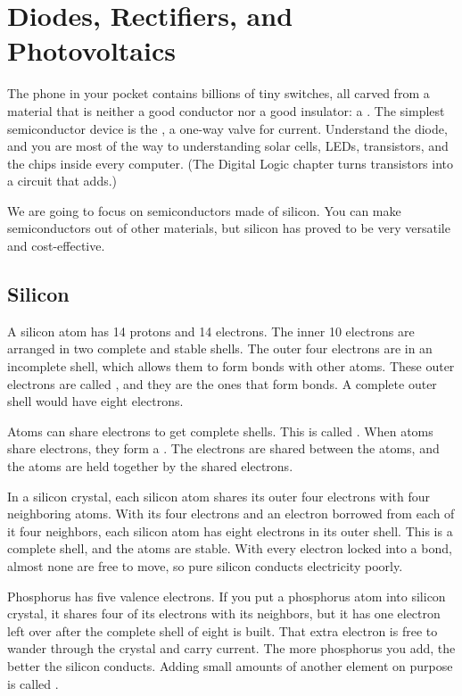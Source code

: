 \chapter{Diodes, Rectifiers, and Photovoltaics}

The phone in your pocket contains billions of tiny switches, all carved
from a material that is neither a good conductor nor a good insulator: a
. The simplest semiconductor
device is the , a one-way valve for current.
Understand the diode, and you are most of the way to understanding solar
cells, LEDs, transistors, and the chips inside every computer. (The Digital Logic chapter turns transistors into a circuit that adds.)

We are going to focus on semiconductors made of silicon. You can make semiconductors out of other materials, but silicon has proved to be very versatile and cost-effective.

\section{Silicon}

A silicon atom has 14 protons and 14 electrons.  The inner 10 electrons are arranged in two complete and stable shells.  The outer four electrons are in an incomplete shell, which allows them to form bonds with other atoms. These outer electrons are called , and they are the ones that form bonds. A complete outer shell would have eight electrons.

Atoms can share electrons to get complete shells.  This is called .  When atoms share electrons, they form a .  The electrons are shared between the atoms, and the atoms are held together by the shared electrons.

In a silicon crystal, each silicon atom shares its outer four electrons with four neighboring atoms. With its four electrons and an electron borrowed from each of it four neighbors, each silicon atom has eight electrons in its outer shell. This is a complete shell, and the atoms are stable. With every electron
locked into a bond, almost none are free to move, so pure silicon conducts
electricity poorly.

Phosphorus has five valence electrons. If you put a phosphorus atom into silicon crystal, it shares four of its electrons with its neighbors, but it has one electron left over after the complete shell of eight is built. That extra electron is free to wander through the crystal and carry
current. The more phosphorus you add, the better the silicon conducts.
Adding small amounts of another element on purpose is called
.

